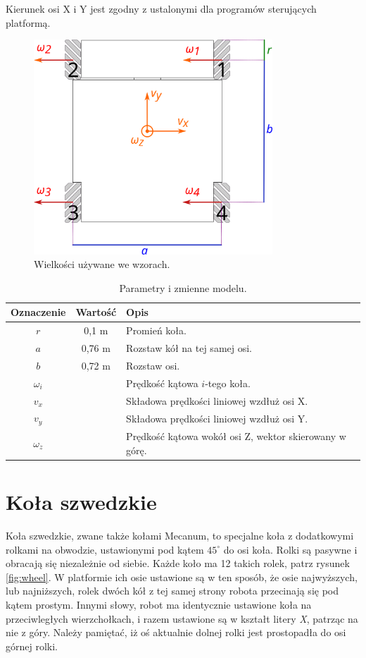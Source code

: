 	Kierunek osi X i Y jest zgodny z ustalonymi dla programów sterujących platformą.
	
	\begin{figure}[H]
		\centering
		\includegraphics[width=0.8\textwidth]{graphics/base_dims.pdf}
		\caption{Wielkości używane we wzorach.}
		\label{fig:base_dims}
	\end{figure} 

	\begin{table}
		\centering
		\begin{tabular}{c c l}
		Oznaczenie & Wartość & Opis \\
		\hline
		$r$ & 0,1 m & Promień koła. \\
		$a$ & 0,76 m & Rozstaw kół na tej samej osi. \\
		$b$ & 0,72 m & Rozstaw osi. \\
		$\omega_i$ & & Prędkość kątowa $i$-tego koła. \\
		$v_x$ & & Składowa prędkości liniowej wzdłuż osi X. \\
		$v_y$ & & Składowa prędkości liniowej wzdłuż osi Y. \\
		$\omega_z$ & & Prędkość kątowa wokół osi Z, wektor skierowany w górę. \\
		\end{tabular}
		\caption{Parametry i zmienne modelu.}
		\label{tab:dims}
	\end{table}
	
	

\section{Koła szwedzkie}
	Koła szwedzkie, zwane także kołami Mecanum, to specjalne koła z dodatkowymi rolkami na obwodzie, ustawionymi pod kątem $45^\circ$ do osi koła.
	Rolki są pasywne i obracają się niezależnie od siebie. Każde koło ma 12 takich rolek, patrz rysunek \ref{fig:wheel}.
	W platformie ich osie ustawione są w ten sposób, że osie najwyższych, lub najniższych, rolek dwóch kół z tej samej strony robota przecinają się pod kątem prostym.
	Innymi słowy, robot ma identycznie ustawione koła na przeciwległych wierzchołkach, i razem ustawione są w kształt litery \emph{X}, patrząc na nie z góry.
	Należy pamiętać, iż oś aktualnie dolnej rolki jest prostopadła do osi górnej rolki.

